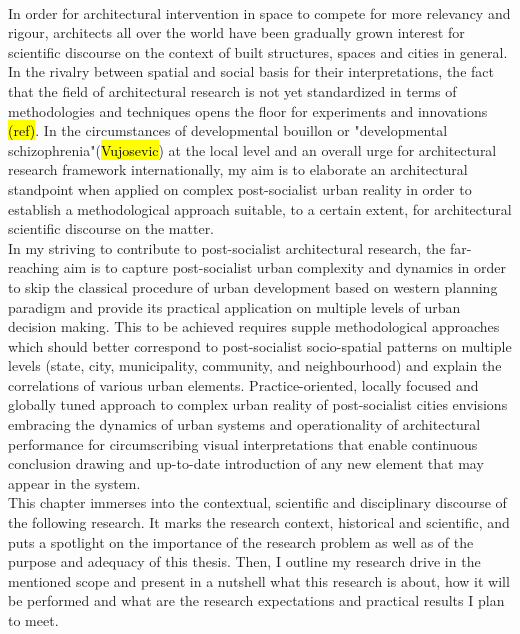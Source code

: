 \documentclass[11pt]{report}
\begin{document}
\\
In order for architectural intervention in space to compete for more relevancy and rigour,  architects all over the world have been gradually grown interest for scientific discourse on the context of built structures, spaces and cities in general.  In the rivalry between spatial and social basis for their interpretations, the fact that the field of architectural research is not yet standardized in terms of methodologies and techniques opens the floor for experiments and innovations \hl{(ref)}. In the circumstances of developmental bouillon or "developmental schizophrenia"(\hl{Vujosevic}) at the local level and an overall urge for architectural research framework internationally, my aim is to elaborate an architectural standpoint when applied on complex post-socialist urban reality in order to establish a methodological approach suitable, to a certain extent, for architectural scientific discourse on the matter.
\\
In my striving to contribute to post-socialist architectural research, the far-reaching aim is to capture post-socialist urban complexity and dynamics in order to skip the classical procedure of urban development based on western planning paradigm and provide its practical application on multiple levels of urban decision making. This to be achieved requires supple methodological approaches which should better correspond to post-socialist socio-spatial patterns on multiple levels (state, city, municipality, community, and neighbourhood) and explain the correlations of various urban elements. Practice-oriented, locally focused and globally tuned approach to complex urban reality of post-socialist cities envisions embracing the dynamics of urban systems and operationality of architectural performance for circumscribing visual interpretations that enable continuous conclusion drawing and up-to-date introduction of any new element that may appear in the system.
\\
This chapter immerses into the contextual, scientific and disciplinary discourse of the following research. It marks the research context, historical and scientific, and puts a spotlight on the importance of the research problem as well as of the purpose and adequacy of this thesis. Then, I outline my research drive in the mentioned scope and present in a nutshell what this research is about, how it will be performed and what are the research expectations and practical results I plan to meet. 
\end{document}
